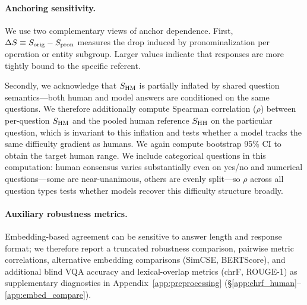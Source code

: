 \documentclass[letterpaper]{article}
\begin{document}
\paragraph{Anchoring sensitivity.} We use two complementary views of anchor dependence. First, $\Delta S \equiv S_{\mathrm{orig}} - S_{\mathrm{pron}}$ measures the drop induced by pronominalization per operation or entity subgroup. Larger values indicate that responses are more tightly bound to the specific referent. 

Secondly, we acknowledge that $\sHM$ is partially inflated by shared question semantics---both human and model answers are conditioned on the same questions. %
We therefore additionally compute Spearman correlation ($\rho$) between per-question $\sHM$ and the pooled human reference $\sHH$ on the particular question, which is invariant to this inflation and tests whether a model tracks the same difficulty gradient as humans. We again compute bootstrap 95\% CI to obtain the target human range. 
We include categorical questions in this computation: human consensus varies substantially even on yes/no and numerical questions---some are near-unanimous, others are evenly split---so $\rho$ across all question types tests whether models recover this difficulty structure broadly. %

\paragraph{Auxiliary robustness metrics.} 
Embedding-based agreement can be sensitive to answer length and response format; we therefore report a truncated robustness comparison, pairwise metric correlations, alternative embedding comparisons (SimCSE, BERTScore), and additional blind VQA accuracy and lexical-overlap metrics (chrF, ROUGE-1) as supplementary diagnostics in Appendix~\ref{app:preprocessing} (\S\ref{app:chrf_human}--\ref{app:embed_compare}). %
\end{document}
